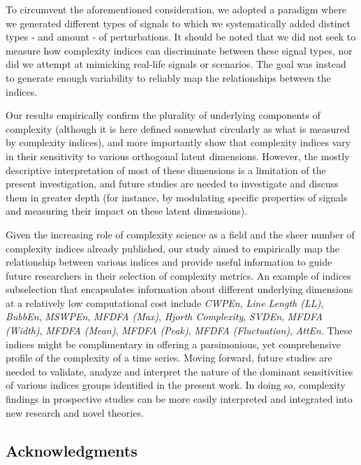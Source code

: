 \documentclass[
  man]{apa6}
\begin{document}
To circumvent the aforementioned consideration, we adopted a paradigm where we generated different types of signals to which we systematically added distinct types - and amount - of perturbations. It should be noted that we did not seek to measure how complexity indices can discriminate between these signal types, nor did we attempt at mimicking real-life signals or scenarios. The goal was instead to generate enough variability to reliably map the relationships between the indices.

Our results empirically confirm the plurality of underlying components of complexity (although it is here defined somewhat circularly as what is measured by complexity indices), and more importantly show that complexity indices vary in their sensitivity to various orthogonal latent dimensions. However, the mostly descriptive interpretation of most of these dimensions is a limitation of the present investigation, and future studies are needed to investigate and discuss them in greater depth (for instance, by modulating specific properties of signals and measuring their impact on these latent dimensions).

Given the increasing role of complexity science as a field and the sheer number of complexity indices already published, our study aimed to empirically map the relationship between various indices and provide useful information to guide future researchers in their selection of complexity metrics. An example of indices subselection that encapsulates information about different underlying dimensions at a relatively low computational cost include \emph{CWPEn}, \emph{Line Length (LL)}, \emph{BubbEn}, \emph{MSWPEn}, \emph{MFDFA (Max)}, \emph{Hjorth Complexity}, \emph{SVDEn}, \emph{MFDFA (Width)}, \emph{MFDFA (Mean)}, \emph{MFDFA (Peak)}, \emph{MFDFA (Fluctuation)}, \emph{AttEn}. These indices might be complimentary in offering a parsimonious, yet comprehensive profile of the complexity of a time series. Moving forward, future studies are needed to validate, analyze and interpret the nature of the dominant sensitivities of various indices groups identified in the present work. In doing so, complexity findings in prospective studies can be more easily interpreted and integrated into new research and novel theories.

\hypertarget{acknowledgments}{%
\subsection{Acknowledgments}\label{acknowledgments}}
\end{document}
